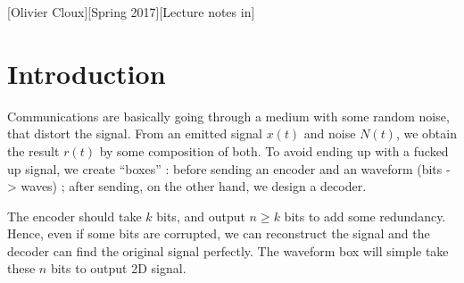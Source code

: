 \documentclass[11pt,a4paper]{article}
\begin{document}
[Olivier Cloux][Spring 2017][Lecture notes in]
\tableofcontents

\section{Introduction}
Communications are basically going through a medium with some random noise, that distort the signal. From an emitted signal $x(t)$ and noise $N(t)$, we obtain the result $r(t)$ by some composition of both. To avoid ending up with a fucked up signal, we create ``boxes'' : before sending an encoder and an waveform (bits -> waves) ; after sending, on the other hand, we design a decoder.

The encoder should take $k$ bits, and output $n\geq k$ bits to add some redundancy. Hence, even if some bits are corrupted, we can reconstruct the signal and the decoder can find the original signal perfectly. The waveform box will simple take these $n$ bits to output 2D signal.
\end{document}
